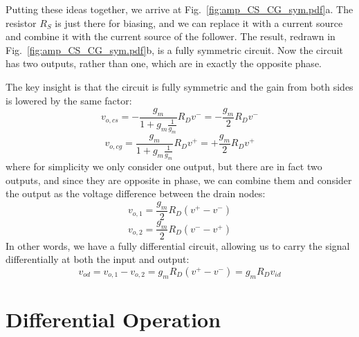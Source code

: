 Putting these ideas together, we arrive at Fig.~\ref{fig:amp_CS_CG_sym.pdf}a.  The resistor $R_S$ is just there for biasing, and we can replace it with a current source and combine it with the current source of the follower.  The result, redrawn in Fig.~\ref{fig:amp_CS_CG_sym.pdf}b, is a fully symmetric circuit.  Now the circuit has two outputs, rather than one, which are in exactly the opposite phase.  

The key insight is that the circuit is fully symmetric and the gain from both sides is lowered by the same factor:
\begin{equation}
	v_{o,cs} = -\frac{g_m}{1+g_m \frac{1}{g_m} } R_D v^- = -\frac{g_m}{2} R_D v^-   
\end{equation}
\begin{equation}
	v_{o,cg} = \frac{g_m}{1+g_m \frac{1}{g_m} } R_D v^+ = +\frac{g_m}{2} R_D v^+   
\end{equation}
where for simplicity we only consider one output, but there are in fact two outputs, and since they are opposite in phase, we can combine them and consider the output as the voltage difference between the drain nodes:
\begin{equation}
	v_{o,1} = \frac{g_m}{2} R_D (v^+ - v^-)  
\end{equation}
\begin{equation}
	v_{o,2} = \frac{g_m}{2} R_D (v^- - v^+)  
\end{equation}
In other words, we have a fully differential circuit, allowing us to carry the signal differentially at both the input and output:
\begin{equation}
	v_{od} = v_{o,1} - v_{o,2} = g_m R_D (v^+ - v^-) = g_m R_D v_{id}  
\end{equation}
\section{Differential Operation}
